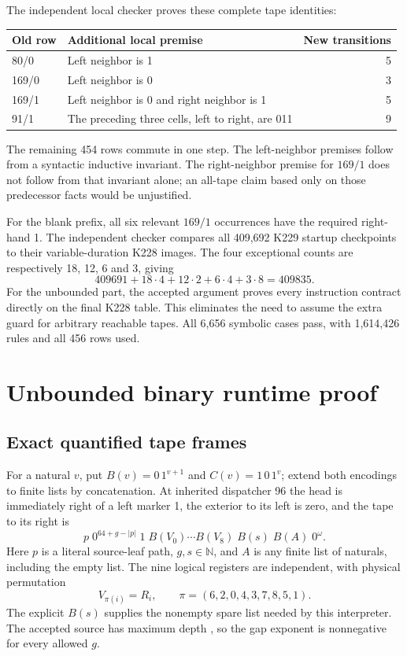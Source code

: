 \documentclass[11pt,a4paper]{article}
\begin{document}
The independent local checker proves these complete tape identities:
\begin{center}\small
\begin{tabularx}{\textwidth}{@{}l X r@{}}
\toprule
Old row & Additional local premise & New transitions\\
\midrule
80/0 & Left neighbor is 1 & 5\\
169/0 & Left neighbor is 0 & 3\\
169/1 & Left neighbor is 0 and right neighbor is 1 & 5\\
91/1 & The preceding three cells, left to right, are 011 & 9\\
\bottomrule
\end{tabularx}
\end{center}
The remaining 454 rows commute in one step. The left-neighbor premises
follow from a syntactic inductive invariant. The right-neighbor premise
for $169/1$ does not follow from that invariant alone; an all-tape
claim based only on those predecessor facts would be unjustified.

For the blank prefix, all six relevant $169/1$ occurrences have the
required right-hand 1. The independent checker compares all 409,692
K229 startup checkpoints to their variable-duration K228 images.
The four exceptional counts are respectively 18, 12, 6 and 3, giving
\[
409691 + 18\cdot4 + 12\cdot2 + 6\cdot4 + 3\cdot8=409835.
\]
For the unbounded part, the accepted argument proves every instruction
contract directly on the final K228 table. This eliminates the need
to assume the extra guard for arbitrary reachable tapes. All 6,656
symbolic cases pass, with 1,614,426 rules and all 456 rows used.




\section{Unbounded binary runtime proof}
\label{sec:runtime}

\subsection{Exact quantified tape frames}

For a natural $v$, put $B(v)=0\,1^{v+1}$ and $C(v)=1\,0\,1^v$;
extend both encodings to finite lists by concatenation. At inherited
dispatcher 96 the head is immediately right of a left marker 1, the
exterior to its left is zero, and the tape to its right is
\begin{equation}
 p\;0^{64+g-|p|}\;1\;
 B(V_0)\cdots B(V_8)\;B(s)\;B(A)\;0^\omega.
 \label{eq:frame}
\end{equation}
Here $p$ is a literal source-leaf path, $g,s\in\mathbb N$, and $A$
is any finite list of naturals, including the empty list. The nine
logical registers are independent, with physical permutation
\[
 V_{\pi(i)}=R_i,\qquad \pi=(6,2,0,4,3,7,8,5,1).
\]
The explicit $B(s)$ supplies the nonempty spare list needed by this
interpreter. The accepted source has maximum depth \SourceDepth,
so the gap exponent is nonnegative for every allowed $g$.
\end{document}
